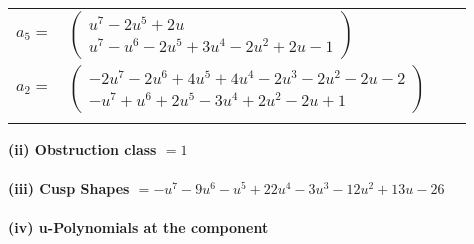 \documentclass[1p]{elsarticle_modified}
\theoremstyle{definition}
\begin{document}
\begin{tabular}{m{7pt} m{180pt} m{7pt} m{180pt} }
\flushright $a_{5}=$&$\begin{pmatrix}u^7-2 u^5+2 u\\u^7- u^6-2 u^5+3 u^4-2 u^2+2 u-1\end{pmatrix}$ \\
\flushright $a_{2}=$&$\begin{pmatrix}-2 u^7-2 u^6+4 u^5+4 u^4-2 u^3-2 u^2-2 u-2\\- u^7+u^6+2 u^5-3 u^4+2 u^2-2 u+1\end{pmatrix}$\\&\end{tabular}
\flushleft \textbf{(ii) Obstruction class $= 1$}\\~\\
\flushleft \textbf{(iii) Cusp Shapes $= - u^7-9 u^6- u^5+22 u^4-3 u^3-12 u^2+13 u-26$}\\~\\
\newpage\renewcommand{\arraystretch}{1}
\flushleft \textbf{(iv) u-Polynomials at the component}\newline \\
\end{document}
